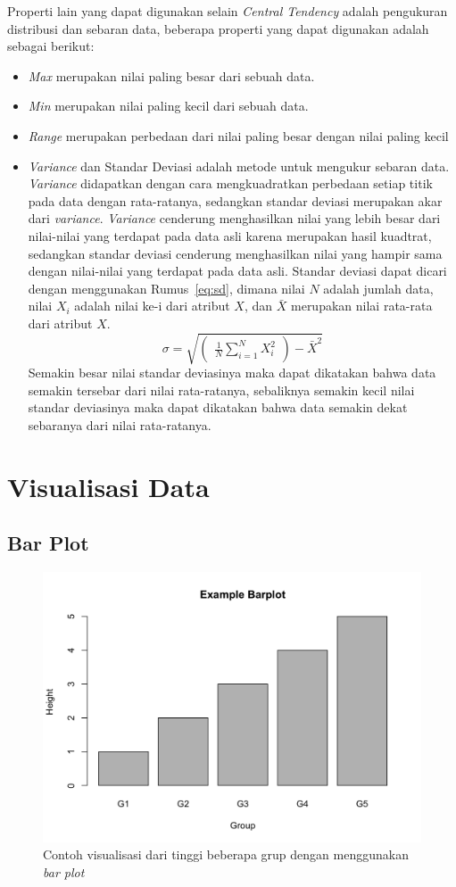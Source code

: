 Properti lain yang dapat digunakan selain \textit{Central Tendency} adalah pengukuran distribusi dan sebaran data, beberapa properti yang dapat digunakan adalah sebagai berikut:
\begin{itemize}
    \item \textit{Max} merupakan nilai paling besar dari sebuah data.
    \item \textit{Min} merupakan nilai paling kecil dari sebuah data.
    \item \textit{Range} merupakan perbedaan dari nilai paling besar dengan nilai paling kecil
    \item  \textit{Variance} dan Standar Deviasi adalah metode untuk mengukur sebaran data. \textit{Variance} didapatkan dengan cara mengkuadratkan perbedaan setiap titik pada data dengan rata-ratanya, sedangkan standar deviasi merupakan akar dari \textit{variance}. \textit{Variance} cenderung menghasilkan nilai yang lebih besar dari nilai-nilai yang terdapat pada data asli karena merupakan hasil kuadtrat, sedangkan standar deviasi cenderung menghasilkan nilai yang hampir sama dengan nilai-nilai yang terdapat pada data asli. Standar deviasi dapat dicari dengan menggunakan Rumus~\ref{eq:sd}, dimana nilai $N$ adalah jumlah data, nilai $X_i$ adalah nilai ke-i dari atribut $X$, dan $\bar{X}$ merupakan nilai rata-rata dari atribut $X$.
    \begin{equation}
    \label{eq:sd}
        \sigma = \sqrt{
        \begin{pmatrix}
            \frac{1}{N} \sum_{i=1}^NX_i^2
        \end{pmatrix}
        -\bar{X}^2}
    \end{equation}
    Semakin besar nilai standar deviasinya maka dapat dikatakan bahwa data semakin tersebar dari nilai rata-ratanya, sebaliknya semakin kecil nilai standar deviasinya maka dapat dikatakan bahwa data semakin dekat sebaranya dari nilai rata-ratanya.
\end{itemize}

\section{Visualisasi Data}
\label{sec:visdat}

\subsection{Bar Plot}
\label{subsec:barplot}

\begin{figure}[h]
    \centering
    \includegraphics[width=0.4\linewidth]{Gambar/contoh barplot.png}
    \caption{Contoh visualisasi dari tinggi beberapa grup dengan menggunakan \textit{bar plot}}
    \label{fig:contoh barplot}
\end{figure}

